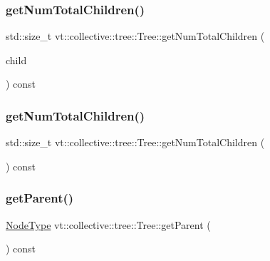 \subsubsection{\texorpdfstring{get\+Num\+Total\+Children()}{getNumTotalChildren()}\hspace{0.1cm}{\footnotesize\ttfamily [1/2]}}
{\footnotesize\ttfamily std\+::size\+\_\+t vt\+::collective\+::tree\+::\+Tree\+::get\+Num\+Total\+Children (\begin{DoxyParamCaption}\item[{\hyperlink{namespacevt_a866da9d0efc19c0a1ce79e9e492f47e2}{Node\+Type}}]{child }\end{DoxyParamCaption}) const}

\mbox{\label{structvt_1_1collective_1_1tree_1_1_tree_a294b7827285c140d412a4344f3b135d5}} 
\subsubsection{\texorpdfstring{get\+Num\+Total\+Children()}{getNumTotalChildren()}\hspace{0.1cm}{\footnotesize\ttfamily [2/2]}}
{\footnotesize\ttfamily std\+::size\+\_\+t vt\+::collective\+::tree\+::\+Tree\+::get\+Num\+Total\+Children (\begin{DoxyParamCaption}{ }\end{DoxyParamCaption}) const}

\mbox{\label{structvt_1_1collective_1_1tree_1_1_tree_ab509dada696b718152e8ac04edd551af}} 
\subsubsection{\texorpdfstring{get\+Parent()}{getParent()}}
{\footnotesize\ttfamily \hyperlink{namespacevt_a866da9d0efc19c0a1ce79e9e492f47e2}{Node\+Type} vt\+::collective\+::tree\+::\+Tree\+::get\+Parent (\begin{DoxyParamCaption}{ }\end{DoxyParamCaption}) const}

